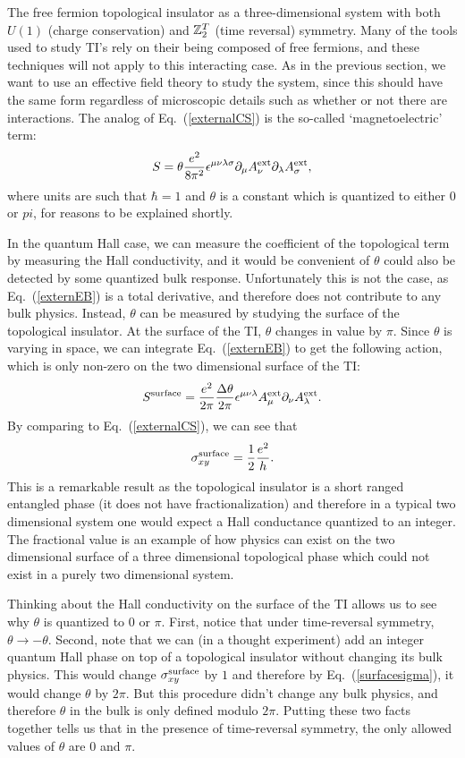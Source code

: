 The free fermion topological insulator as a three-dimensional system with both $U(1)$ (charge conservation) and $\mathbb{Z}_2^T$ (time reversal) symmetry. Many of the tools used to study TI's rely on their being composed of free fermions, and these techniques will not apply to this interacting case. As in the previous section, we want to use an effective field theory to study the system, since this should have the same form regardless of microscopic details such as whether or not there are interactions. The analog of Eq.~(\ref{externalCS}) is the so-called `magnetoelectric' term:\cite{QHZ}
\begin{equation}
S=\theta\frac{e^2}{8\pi^2} \epsilon^{\mu\nu\lambda\sigma} \partial_\mu A^{\rm ext}_\nu \partial_\lambda A^{\rm ext}_\sigma,
\label{externEB}
\end{equation}
where units are such that $\hbar=1$ and $\theta$ is a constant which is quantized to either $0$ or $pi$, for reasons to be explained shortly. 

In the quantum Hall case, we can measure the coefficient of the topological term by measuring the Hall conductivity, and it would be convenient of $\theta$ could also be detected by some quantized bulk response. Unfortunately this is not the case, as Eq.~(\ref{externEB}) is a total derivative, and therefore does not contribute to any bulk physics. Instead, $\theta$ can be measured by studying the surface of the topological insulator. At the surface of the TI, $\theta$ changes in value by $\pi$. Since $\theta$ is varying in space, we can integrate Eq.~(\ref{externEB}) to get the following action, which is only non-zero on the two dimensional surface of the TI:
\begin{equation}
S^{\rm surface}=\frac{e^2}{2\pi}\frac{\Delta\theta}{2\pi} \epsilon^{\mu\nu\lambda} A^{\rm ext}_\mu \partial_\nu A^{\rm ext}_\lambda.
\label{TIsurface}
\end{equation}
By comparing to Eq.~(\ref{externalCS}), we can see that 
\begin{equation}
\sigma_{xy}^{\rm surface}=\frac12\frac{e^2}{h}.
\label{surfacesigma}
\end{equation}
This is a remarkable result as the topological insulator is a short ranged entangled phase (it does not have fractionalization) and therefore in a typical two dimensional system one would expect a Hall conductance quantized to an integer. The fractional value is an example of how physics can exist on the two dimensional surface of a three dimensional topological phase which could not exist in a purely two dimensional system.

	Thinking about the Hall conductivity on the surface of the TI allows us to see why $\theta$ is quantized to $0$ or $\pi$. First, notice that under time-reversal symmetry, $\theta\rightarrow-\theta$. Second, note that we can (in a thought experiment) add an integer quantum Hall phase on top of a topological insulator without changing its bulk physics. This would change $\sigma_{xy}^{\rm surface}$ by $1$ and therefore by Eq.~(\ref{surfacesigma}), it would change $\theta$ by $2\pi$. But this procedure didn't change any bulk physics, and therefore $\theta$ in the bulk is only defined modulo $2\pi$. Putting these two facts together tells us that in the presence of time-reversal symmetry, the only allowed values of $\theta$ are $0$ and $\pi$.

